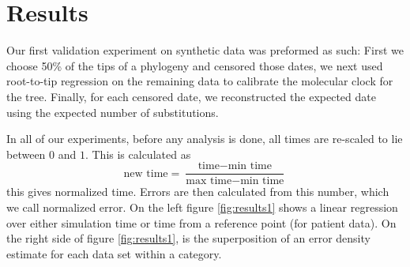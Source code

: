 \section{Results} \label{sec:results}
Our first validation experiment on synthetic data was preformed as such: First we choose 50\% of the tips of a phylogeny and censored those dates, we next used root-to-tip regression \citep{APE} on the remaining data to calibrate the molecular clock for the tree. Finally, for each censored date, we reconstructed the expected date using the expected number of substitutions.

In all of our experiments, before any analysis is done, all times are re-scaled to lie between $0$ and $1$. This is calculated as $$ \text{new time} = \frac{\text{time} - \text{min time}}{\text{max time} - \text{min time}}$$ this gives normalized time. Errors are then calculated from this number, which we call normalized error. On the left figure \ref{fig:results1} shows a linear regression over either simulation time or time from a reference point (for patient data). On the right side of figure \ref{fig:results1}, is the superposition of an error density estimate for each data set within a category. 


